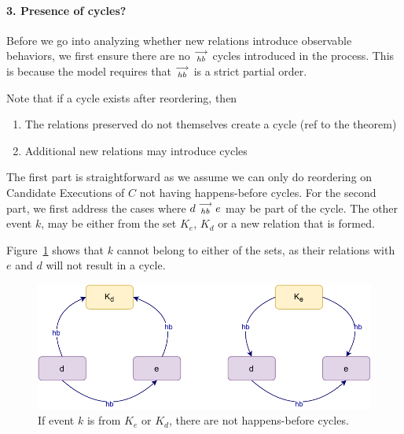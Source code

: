 
\paragraph{3. Presence of cycles?}
    Before we go into analyzing whether new relations introduce observable behaviors, we first ensure there are no $\stackrel{\longrightarrow}{_\textit{hb}}$ cycles introduced in the process. This is because the model requires that $\stackrel{\longrightarrow}{_{hb}}$ is a strict partial order. 
    
    Note that if a cycle exists after reordering, then 
    \begin{enumerate}
        \item The relations preserved do not themselves create a cycle (ref to the theorem)
        \item Additional new relations may introduce cycles
    \end{enumerate}

    The first part is straightforward as we assume we can only do reordering on Candidate Executions of $C$ not having happens-before cycles. 
    For the second part, we first address the cases where $d\stackrel{\longrightarrow}{_{hb}}e$ may be part of the cycle. 
    The other event $k$, may be either from the set $K_e$, $K_d$ or a new relation that is formed\footnotemark.

    
    Figure~\ref{reord:cycle(a)} shows that $k$ cannot belong to either of the sets, as their relations with $e$ and $d$ will not result in a cycle. 
    \begin{figure}[H]
        \centering
        \includegraphics[scale=0.7]{5.InstructionReordering/4.ValidReorderingCandidate/ProofParts/Part3/part3(b).pdf}
        \caption{If event $k$ is from $K_e$ or $K_d$, there are not happens-before cycles.}
        \label{reord:cycle(a)}
    \end{figure}

